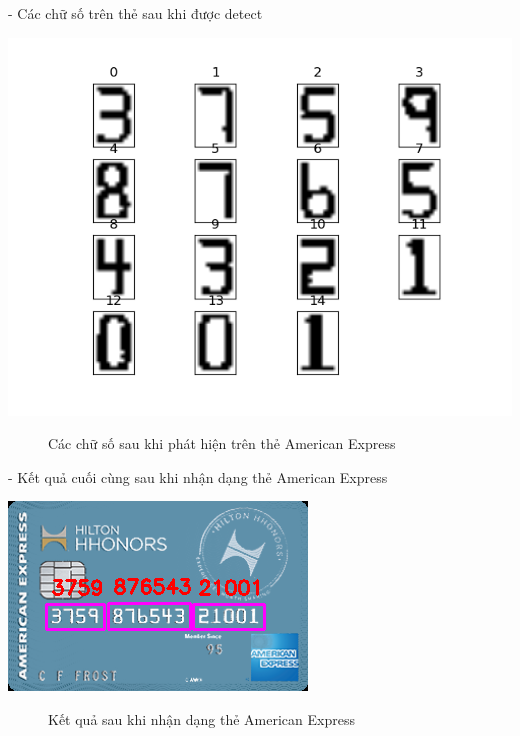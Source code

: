 - Các chữ số trên thẻ sau khi được detect 
\begin{center}
    \includegraphics[scale = 0.8]{images/americanexpress/digits.png}
\end{center}

\begin{figure}[htp!]
    \caption{Các chữ số sau khi phát hiện trên thẻ American Express}
\end{figure}

- Kết quả cuối cùng sau khi nhận dạng thẻ American Express
\begin{center}
    \includegraphics[scale = 1]{images/americanexpress/result.png}
\end{center}
\begin{figure}[htp!]
    \caption{Kết quả sau khi nhận dạng thẻ American Express}
\end{figure}